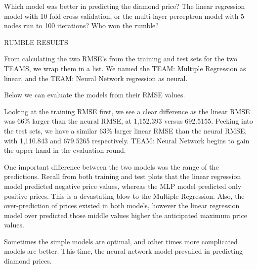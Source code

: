 \documentclass[]{book}
\newenvironment{Shaded}{\begin{snugshade}}{\end{snugshade}}
\newcommand{\CommentTok}[1]{\textcolor[rgb]{0.56,0.35,0.01}{\textit{#1}}}
\newcommand{\DataTypeTok}[1]{\textcolor[rgb]{0.13,0.29,0.53}{#1}}
\newcommand{\KeywordTok}[1]{\textcolor[rgb]{0.13,0.29,0.53}{\textbf{#1}}}
\newcommand{\NormalTok}[1]{#1}
\newcommand{\OperatorTok}[1]{\textcolor[rgb]{0.81,0.36,0.00}{\textbf{#1}}}
\newcommand{\StringTok}[1]{\textcolor[rgb]{0.31,0.60,0.02}{#1}}
\begin{document}
Which model was better in predicting the diamond price? The linear regression model with 10 fold cross validation, or the multi-layer perceptron model with 5 nodes run to 100 iterations? Who won the rumble?

RUMBLE RESULTS

From calculating the two RMSE's from the training and test sets for the two TEAMS, we wrap them in a list. We named the TEAM: Multiple Regression as linear, and the TEAM: Neural Network regression as neural.

\begin{Shaded}
\end{Shaded}

Below we can evaluate the models from their RMSE values.

\begin{Shaded}
\end{Shaded}

Looking at the training RMSE first, we see a clear difference as the linear RMSE was 66\% larger than the neural RMSE, at 1,152.393 versus 692.5155. Peeking into the test sets, we have a similar 63\% larger linear RMSE than the neural RMSE, with 1,110.843 and 679.5265 respectively. TEAM: Neural Network begins to gain the upper hand in the evaluation round.

One important difference between the two models was the range of the predictions. Recall from both training and test plots that the linear regression model predicted negative price values, whereas the MLP model predicted only positive prices. This is a devastating blow to the Multiple Regression. Also, the over-prediction of prices existed in both models, however the linear regression model over predicted those middle values higher the anticipated maximum price values.

Sometimes the simple models are optimal, and other times more complicated models are better. This time, the neural network model prevailed in predicting diamond prices.


\end{document}
